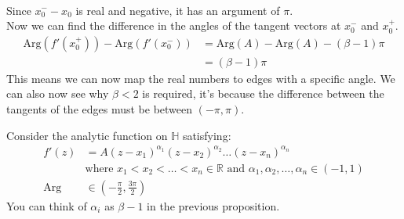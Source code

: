 \begin{proposition}
\begin{align*}
    \end{align*}
    Since $x_0^- - x_0$ is real and negative, it has an argument of $\pi$.\\
    Now we can find the difference in the angles of the tangent vectors at $x_0^-$ and $x_0^+$.
    \begin{align*}
        \text{Arg}(f'(x_0^+)) - \text{Arg}(f'(x_0^-)) & = \text{Arg}(A) - \text{Arg}(A) - (\beta - 1)\pi \\
                                                      & = (\beta - 1)\pi
    \end{align*}
    This means we can now map the real numbers to edges with a specific angle. We can also now see why $\beta < 2$ is required, it's because the difference between the tangents of the edges must be between $(-\pi, \pi)$.
\end{proposition}

\begin{proposition}
    Consider the analytic function on $\mathbb{H}$ satisfying:
    \begin{align*}
        f'(z)      & = A(z - x_1)^{\alpha_1}(z - x_2)^{\alpha_2}\ldots(z - x_n)^{\alpha_n}                                               \\
                   & \text{where } x_1 < x_2 < \ldots < x_n \in \mathbb{R} \text{ and } \alpha_1, \alpha_2, \ldots, \alpha_n \in (-1, 1) \\
        \text{Arg} & \in (-\frac{\pi}{2}, \frac{3\pi}{2})
    \end{align*}
    You can think of $\alpha_i$ as $\beta - 1$ in the previous proposition.\\
\end{proposition}


